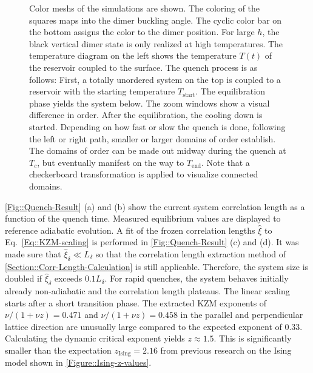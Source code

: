 	\begin{figure}
		\centering
		
		\caption{Color meshs of the simulations are shown. The coloring of the squares maps into  the dimer buckling angle. The cyclic color bar on the bottom assigns the color to the dimer position. For large $h$, the black vertical dimer state is only realized at high temperatures. The temperature diagram on the left shows the temperature $T(t)$ of the reservoir coupled to the surface. The quench process is as follows: First, a totally unordered system on the top is coupled to a reservoir with the starting temperature $T_{\text{start}}$. The equilibration phase yields the system below. The zoom windows show a visual difference in order. After the equilibration, the cooling down is started. Depending on how fast or slow the quench is done, following the left or right path, smaller or larger domains of order establish. The domains of order can be made out midway during the quench at $T_c$, but eventually manifest on the way to $T_{\text{end}}$. Note that a checkerboard transformation is applied to visualize connected domains.}
		\label{Fig::quench-process-concept}
	\end{figure}
	\def\figureautorefname{Figures}\autoref{Fig::Quench-Result} (a) and (b) show the current system correlation length as a function of the quench time. Measured equilibrium values are displayed to reference adiabatic evolution. A fit of the frozen correlation lengths $\hat{\xi}$ to Eq.~\eqref{Eq::KZM-scaling} is performed in \def\figureautorefname{Figs.}\autoref{Fig::Quench-Result} (c) and (d)\def\figureautorefname{Fig.}. It was made sure that $\hat{\xi}_\delta \ll L_\delta$ so that the correlation length extraction method of \autoref{Section::Corr-Length-Calculation} is still applicable. Therefore, the system size is doubled if $\hat{\xi}_\delta$ exceeds $0.1L_\delta$. For rapid quenches, the system behaves initially already non-adiabatic and the correlation length plateaus. The linear scaling starts after a short transition phase. The extracted KZM exponents of $\nu / (1 + \nu z) = 0.471$ and $\nu / (1 + \nu z) = 0.458$ in the parallel and perpendicular lattice direction are unusually large compared to the expected exponent of $0.33$. Calculating the dynamic critical exponent yields $z \approx 1.5$. This is significantly smaller than the expectation $z_\text{Ising}=2.16$ from previous research on the Ising model shown in \autoref{Figure::Ising-z-values}. \\
	
